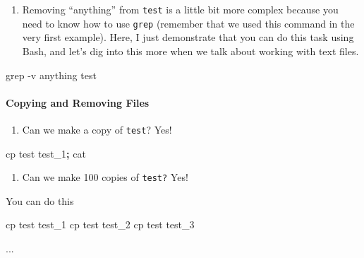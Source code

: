 \documentclass[
]{book}
\newenvironment{Shaded}{\begin{snugshade}}{\end{snugshade}}
\newcommand{\AttributeTok}[1]{\textcolor[rgb]{0.77,0.63,0.00}{#1}}
\newcommand{\ExtensionTok}[1]{#1}
\newcommand{\FunctionTok}[1]{\textcolor[rgb]{0.00,0.00,0.00}{#1}}
\newcommand{\KeywordTok}[1]{\textcolor[rgb]{0.13,0.29,0.53}{\textbf{#1}}}
\newcommand{\NormalTok}[1]{#1}
\newcommand{\StringTok}[1]{\textcolor[rgb]{0.31,0.60,0.02}{#1}}
\providecommand{\tightlist}{%
  \setlength{\itemsep}{0pt}\setlength{\parskip}{0pt}}
\begin{document}
\begin{enumerate}
\def\labelenumi{\arabic{enumi}.}
\setcounter{enumi}{6}
\tightlist
\item
  Removing ``anything'' from \texttt{test} is a little bit more complex because you need to know how to use \texttt{grep} (remember that we used this command in the very first example). Here, I just demonstrate that you can do this task using Bash, and let's dig into this more when we talk about working with text files.
\end{enumerate}

\begin{Shaded}
\begin{Highlighting}[]

\FunctionTok{grep} \AttributeTok{{-}v} \StringTok{\textquotesingle{}anything\textquotesingle{}}\NormalTok{ test}
\end{Highlighting}
\end{Shaded}

\hypertarget{copying-and-removing-files}{%
\paragraph{Copying and Removing Files}\label{copying-and-removing-files}}

\begin{enumerate}
\def\labelenumi{\arabic{enumi}.}
\tightlist
\item
  Can we make a copy of \texttt{test}? Yes!
\end{enumerate}

\begin{Shaded}
\begin{Highlighting}[]

\FunctionTok{cp}\NormalTok{ test test\_1}\KeywordTok{;} \FunctionTok{cat} 
\end{Highlighting}
\end{Shaded}

\begin{enumerate}
\def\labelenumi{\arabic{enumi}.}
\setcounter{enumi}{1}
\tightlist
\item
  Can we make 100 copies of \texttt{test?} Yes!
\end{enumerate}

You can do this

\begin{Shaded}
\begin{Highlighting}[]

\FunctionTok{cp}\NormalTok{ test test\_1 }
\FunctionTok{cp}\NormalTok{ test test\_2}
\FunctionTok{cp}\NormalTok{ test test\_3 }

\ExtensionTok{...} 
\end{Highlighting}
\end{Shaded}
\end{document}
